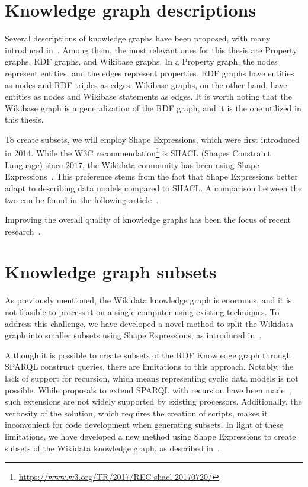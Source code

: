 \section{Knowledge graph descriptions}

Several descriptions of knowledge graphs have been proposed, with many introduced in~\cite{https://doi.org/10.48550/arxiv.2110.11709}. Among them, the most relevant ones for this thesis are Property graphs, RDF graphs, and Wikibase graphs. In a Property graph, the nodes represent entities, and the edges represent properties. RDF graphs have entities as nodes and RDF triples as edges. Wikibase graphs, on the other hand, have entities as nodes and Wikibase statements as edges. It is worth noting that the Wikibase graph is a generalization of the RDF graph, and it is the one utilized in this thesis.

To create subsets, we will employ Shape Expressions, which were first introduced in 2014. While the W3C recommendation\footnote{\url{https://www.w3.org/TR/2017/REC-shacl-20170720/}} is SHACL (Shapes Constraint Language) since 2017, the Wikidata community has been using Shape Expressions~\cite{10.1007/978-3-030-21348-0_39}. This preference stems from the fact that Shape Expressions better adapt to describing data models compared to SHACL. A comparison between the two can be found in the following article~\cite{Labra2017}.

Improving the overall quality of knowledge graphs has been the focus of recent research~\cite{https://doi.org/10.48550/arxiv.2110.11709}.

\section{Knowledge graph subsets}

As previously mentioned, the Wikidata knowledge graph is enormous, and it is not feasible to process it on a single computer using existing techniques. To address this challenge, we have developed a novel method to split the Wikidata graph into smaller subsets using Shape Expressions, as introduced in~\cite{https://doi.org/10.48550/arxiv.2110.11709}.

Although it is possible to create subsets of the RDF Knowledge graph through SPARQL construct queries, there are limitations to this approach. Notably, the lack of support for recursion, which means representing cyclic data models is not possible. While proposals to extend SPARQL with recursion have been made~\cite{10.1007/978-3-319-25007-6_2}, such extensions are not widely supported by existing processors. Additionally, the verbosity of the solution, which requires the creation of scripts, makes it inconvenient for code development when generating subsets. In light of these limitations, we have developed a new method using Shape Expressions to create subsets of the Wikidata knowledge graph, as described in~\cite{https://doi.org/10.48550/arxiv.2110.11709}.

